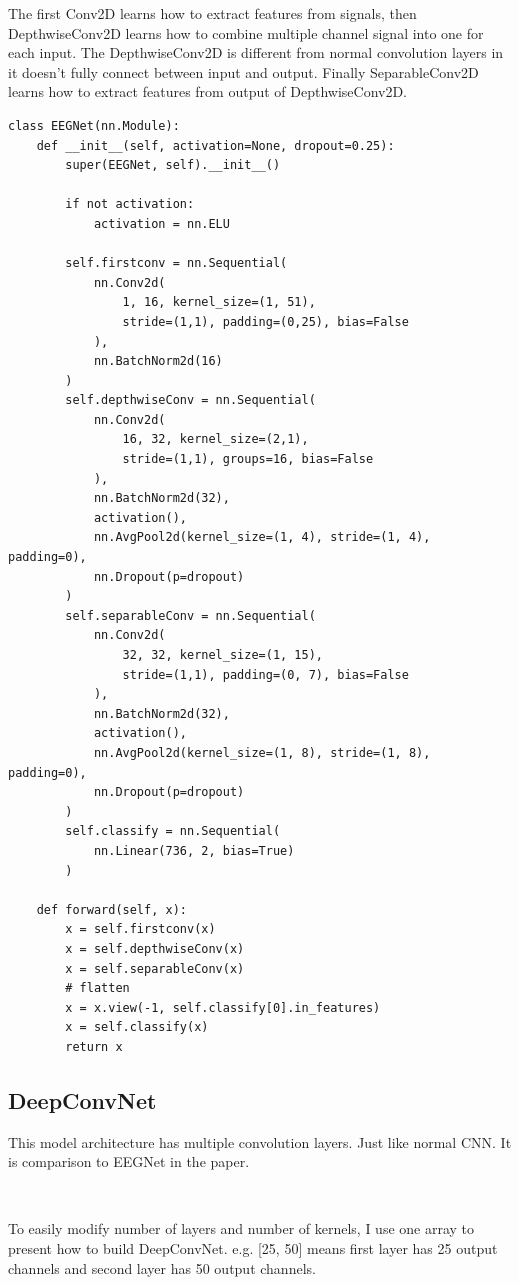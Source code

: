 \documentclass[12pt]{article}
\begin{document}
The first Conv2D learns how to extract features from signals, then DepthwiseConv2D learns how to combine multiple channel signal into one for each input. The DepthwiseConv2D is different from normal convolution layers in it doesn't  fully connect between input and output. Finally SeparableConv2D learns how to extract features from output of DepthwiseConv2D.

\begin{verbatim}
class EEGNet(nn.Module):
    def __init__(self, activation=None, dropout=0.25):
        super(EEGNet, self).__init__()
        
        if not activation:
            activation = nn.ELU
        
        self.firstconv = nn.Sequential(
            nn.Conv2d(
                1, 16, kernel_size=(1, 51),
                stride=(1,1), padding=(0,25), bias=False
            ),
            nn.BatchNorm2d(16)
        )
        self.depthwiseConv = nn.Sequential(
            nn.Conv2d(
                16, 32, kernel_size=(2,1),
                stride=(1,1), groups=16, bias=False
            ),
            nn.BatchNorm2d(32),
            activation(),
            nn.AvgPool2d(kernel_size=(1, 4), stride=(1, 4), padding=0),
            nn.Dropout(p=dropout)
        )
        self.separableConv = nn.Sequential(
            nn.Conv2d(
                32, 32, kernel_size=(1, 15), 
                stride=(1,1), padding=(0, 7), bias=False
            ),
            nn.BatchNorm2d(32),
            activation(),
            nn.AvgPool2d(kernel_size=(1, 8), stride=(1, 8), padding=0),
            nn.Dropout(p=dropout)
        )
        self.classify = nn.Sequential(
            nn.Linear(736, 2, bias=True)
        )
        
    def forward(self, x):
        x = self.firstconv(x)
        x = self.depthwiseConv(x)
        x = self.separableConv(x)
        # flatten
        x = x.view(-1, self.classify[0].in_features)
        x = self.classify(x)
        return x
\end{verbatim}

\subsection{DeepConvNet}

This model architecture has multiple convolution layers. Just like normal CNN. It is comparison to EEGNet in the paper.
\par \ \par
To easily modify number of layers and number of kernels, I use one array to present how to build DeepConvNet. e.g. [25, 50] means first layer has 25 output channels and second layer has 50 output channels.
\end{document}
